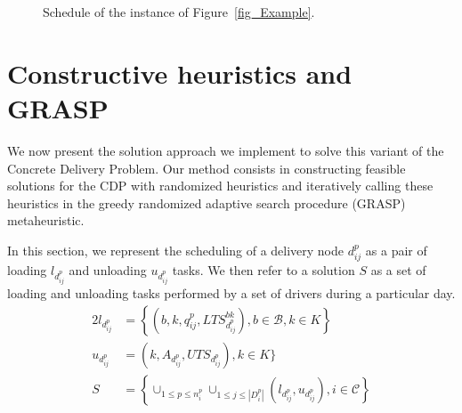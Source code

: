\documentclass{article}
\begin{document}
{\begin{figure}[!htb]
\begin{adjustbox}{max width=0.85\textwidth}
    \end{adjustbox}
    \caption{Schedule of the instance of Figure~\ref{fig_Example}.}
    \label{fig:ganttExample}
\end{figure}


\section{Constructive heuristics and GRASP}
\label{method}

We now present the solution approach we implement to solve this variant of the Concrete Delivery Problem. Our method consists in constructing feasible solutions for the CDP with randomized heuristics and iteratively calling these heuristics in the greedy randomized adaptive search procedure (GRASP) metaheuristic.

In this section, we represent the scheduling of a delivery node $d^p_{ij}$ as a pair of loading $l_{d^p_{ij}}$ and unloading $u_{d^p_{ij}}$ tasks. We then refer to a solution $S$ as a set of loading and unloading tasks performed by a set of drivers during a particular day.
\begin{alignat*}{2}
    l_{d^p_{ij}} &= \left\lbrace (b,k,q^p_{ij},LTS^{bk}_{d^p_{ij}}), b \in \mathcal{B}, k \in K \right\rbrace \\
    u_{d^p_{ij}} & =  (k,A_{{d^p_{ij}}}, UTS_{{d^p_{ij}}}), k \in K  \} \\
    S &=\left\lbrace \cup _{1 \leq p \leq n^p_i} \cup _{1 \leq j \leq |D^p_i|} (l_{d^p_{ij}},u_{d^p_{ij}}), i \in \mathcal{C} \right\rbrace
\end{alignat*}
 

}
\end{document}
